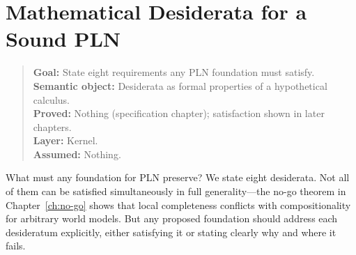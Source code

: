 \documentclass[11pt,openany]{report}
\begin{document}
\chapter{Mathematical Desiderata for a Sound PLN}
\label{ch:desiderata}

\begin{quote}\small
\textbf{Goal:} State eight requirements any PLN foundation must satisfy.\\
\textbf{Semantic object:} Desiderata as formal properties of a hypothetical calculus.\\
\textbf{Proved:} Nothing (specification chapter); satisfaction shown in later chapters.\\
\textbf{Layer:} Kernel.\\
\textbf{Assumed:} Nothing.
\end{quote}

What must any foundation for PLN preserve?  We state eight desiderata.  Not
all of them can be satisfied simultaneously in full generality---the no-go
theorem in Chapter~\ref{ch:no-go} shows that local completeness conflicts
with compositionality for arbitrary world models.  But any proposed
foundation should address each desideratum explicitly, either satisfying it
or stating clearly why and where it fails.
\end{document}
